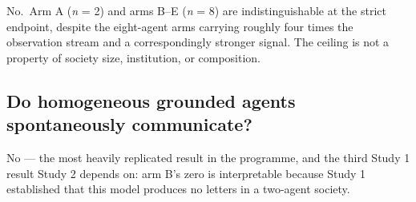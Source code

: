 \documentclass[pdflatex,sn-basic]{sn-jnl}
\begin{document}
No.~Arm A (\emph{n} = 2) and arms B--E (\emph{n} = 8) are indistinguishable at the strict endpoint,
despite the eight-agent arms carrying roughly four times the observation stream and a
correspondingly stronger signal. The ceiling is not a property of society size,
institution, or composition.

\hypertarget{do-homogeneous-grounded-agents-spontaneously-communicate}{%
\subsection{Do homogeneous grounded agents spontaneously communicate?}\label{do-homogeneous-grounded-agents-spontaneously-communicate}}

No --- the most heavily replicated result in the programme, and the third Study 1 result
Study 2 depends on: arm B's zero is interpretable because Study 1 established that this
model produces no letters in a two-agent society.
\end{document}
